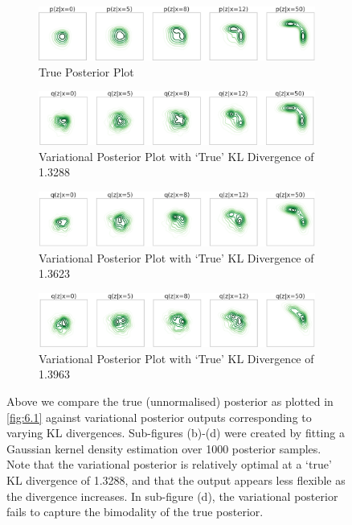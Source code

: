 \documentclass[honours,12pt, twoside]{unswthesis}
\numberwithin{equation}{section}
\theoremstyle{definition}
\begin{document}
\begin{figure}[h!]
\begin{subfigure}{\textwidth}
\includegraphics[width=\linewidth]{sprinklertrue.png}
\caption{True Posterior Plot}
\end{subfigure}
\begin{subfigure}{\textwidth}
\includegraphics[width=\linewidth]{13288.png}
\caption{Variational Posterior Plot with `True' KL Divergence of 1.3288}
\end{subfigure}
\begin{subfigure}{\textwidth}
\includegraphics[width=\linewidth]{13623.png}
\caption{Variational Posterior Plot with `True' KL Divergence of 1.3623}
\end{subfigure}
\begin{subfigure}{\textwidth}
\includegraphics[width=\linewidth]{13963.png}
\caption{Variational Posterior Plot with `True' KL Divergence of 1.3963}
\end{subfigure}
\caption{\small Above we compare the true (unnormalised) posterior as plotted in \autoref{fig:6.1} against variational posterior outputs corresponding to varying KL divergences. Sub-figures (b)-(d) were created by fitting a Gaussian kernel density estimation over 1000 posterior samples. Note that the variational posterior is relatively optimal at a `true' KL divergence of 1.3288, and that the output appears less flexible as the divergence increases. In sub-figure (d), the variational posterior fails to capture the bimodality of the true posterior.}
\label{fig:6.4}
\end{figure}
\newpage
\end{document}
